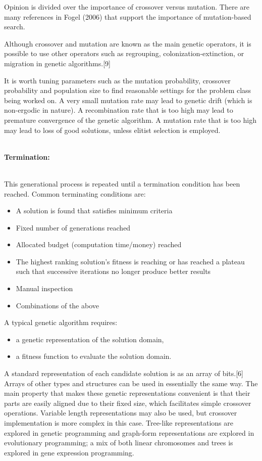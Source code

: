 \documentclass[a4paper, 12pt]{article}
\begin{document}
Opinion is divided over the importance of crossover versus mutation. There are many references in Fogel (2006) that support the importance of mutation-based search.

Although crossover and mutation are known as the main genetic operators, it is possible to use other operators such as regrouping, colonization-extinction, or migration in genetic algorithms.[9]

It is worth tuning parameters such as the mutation probability, crossover probability and population size to find reasonable settings for the problem class being worked on. A very small mutation rate may lead to genetic drift (which is non-ergodic in nature). A recombination rate that is too high may lead to premature convergence of the genetic algorithm. A mutation rate that is too high may lead to loss of good solutions, unless elitist selection is employed.\\~\\
\begin{large}\textbf{Termination:}\end{large}\\
This generational process is repeated until a termination condition has been reached. Common terminating conditions are:
\begin{itemize}
\item A solution is found that satisfies minimum criteria
\item Fixed number of generations reached
\item Allocated budget (computation time/money) reached
\item The highest ranking solution's fitness is reaching or has reached a plateau such that successive iterations no longer produce better results
\item Manual inspection
\item Combinations of the above
\end{itemize}
A typical genetic algorithm requires:
\begin{itemize}
\item a genetic representation of the solution domain,
\item a fitness function to evaluate the solution domain.
\end{itemize}
A standard representation of each candidate solution is as an array of bits.[6] Arrays of other types and structures can be used in essentially the same way. The main property that makes these genetic representations convenient is that their parts are easily aligned due to their fixed size, which facilitates simple crossover operations. Variable length representations may also be used, but crossover implementation is more complex in this case. Tree-like representations are explored in genetic programming and graph-form representations are explored in evolutionary programming; a mix of both linear chromosomes and trees is explored in gene expression programming.
\end{document}
